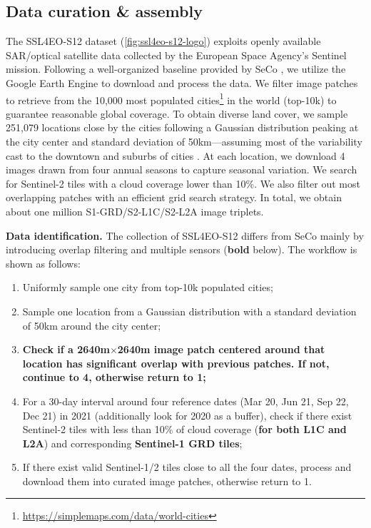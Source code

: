\documentclass[lettersize,journal]{IEEEtran}
\begin{document}
\subsection{Data curation \& assembly}
\label{sec:datacuration}
The SSL4EO-S12 dataset (\cref{fig:ssl4eo-s12-logo}) exploits openly available SAR/optical satellite data collected by the European Space Agency's Sentinel mission. Following a well-organized baseline provided by SeCo \cite{manas2021seasonal}, we utilize the Google Earth Engine \citep{gorelick2017google} to download and process the data. We filter image patches to retrieve from the 10,000 most populated cities\footnote{\url{https://simplemaps.com/data/world-cities}} in the world (top-10k) to guarantee reasonable global coverage. To obtain diverse land cover, we sample 251,079 locations close by the cities following a Gaussian distribution peaking at the city center and standard deviation of 50km---assuming most of the variability cast to the downtown and suburbs of cities \citep{manas2021seasonal}. At each location, we download 4 images drawn from four annual seasons to capture seasonal variation. We search for Sentinel-2 tiles with a cloud coverage lower than 10\%. We also filter out most overlapping patches with an efficient grid search strategy. In total, we obtain about one million S1-GRD/S2-L1C/S2-L2A image triplets.

\textbf{Data identification.} The collection of SSL4EO-S12 differs from SeCo mainly by introducing overlap filtering and multiple sensors (\textbf{bold} below). The workflow is shown as follows:

\begin{enumerate}
\small
    \item Uniformly sample one city from top-10k populated cities;
    \vspace{0.2em}
    \item Sample one location from a Gaussian distribution with a standard deviation of 50km around the city center;
    \vspace{0.2em}
    \item \textbf{Check if a 2640m$\times$2640m image patch centered around that location has significant overlap with previous patches. If not, continue to 4, otherwise return to 1;}
    \vspace{0.2em}
    \item For a 30-day interval around four reference dates (Mar 20, Jun 21, Sep 22, Dec 21) in 2021 (additionally look for 2020 as a buffer), check if there exist Sentinel-2 tiles with less than 10\% of cloud coverage (\textbf{for both L1C and L2A}) and corresponding \textbf{Sentinel-1 GRD tiles};
    \vspace{0.2em}
    \item If there exist valid Sentinel-1/2 tiles close to all the four dates, process and download them into curated image patches, otherwise return to 1.
\end{enumerate}
\end{document}
